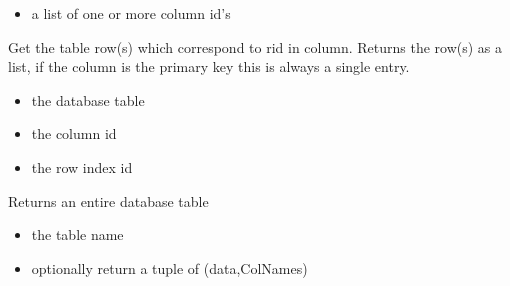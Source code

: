 \documentclass[letterpaper,10pt,english]{sphinxmanual}
\begin{document}
\begin{fulllineitems}
\begin{fulllineitems}
\begin{itemize}
\item {} 
\sphinxAtStartPar
{} a list of one or more column id’s

\end{itemize}

\end{fulllineitems}


\begin{fulllineitems}
\label{\detokenize{modules_doc:cbmpy.CBNetDB.DBTools.getRow}}
\pysigstartsignatures
{}
\pysigstopsignatures
\sphinxAtStartPar
Get the table row(s) which correspond to rid in column. Returns the row(s) as a list, if the column is the primary key
this is always a single entry.
\begin{itemize}
\item {} 
\sphinxAtStartPar
{} the database table

\item {} 
\sphinxAtStartPar
{} the column id

\item {} 
\sphinxAtStartPar
{} the row index id

\end{itemize}

\end{fulllineitems}


\begin{fulllineitems}
\label{\detokenize{modules_doc:cbmpy.CBNetDB.DBTools.getTable}}
\pysigstartsignatures
{}
\pysigstopsignatures
\sphinxAtStartPar
Returns an entire database table
\begin{itemize}
\item {} 
\sphinxAtStartPar
{} the table name

\item {} 
\sphinxAtStartPar
{} optionally return a tuple of (data,ColNames)


\end{itemize}
\end{fulllineitems}
\end{fulllineitems}
\end{document}
